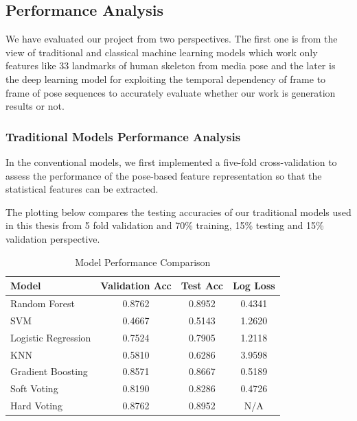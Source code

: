 \subsection{Performance Analysis}

We have evaluated our project from two perspectives. The first one is from the view of traditional and classical machine learning models which work only features like 33 landmarks of human skeleton from media pose and the later is the deep learning model for exploiting the temporal dependency of frame to frame of pose sequences to accurately evaluate whether our work is generation results or not.

\subsubsection{Traditional Models Performance Analysis}

In the conventional models, we first implemented a five-fold cross-validation to assess the performance of the pose-based feature representation so that the statistical features can be extracted.

The plotting below compares the testing accuracies of our traditional models used in this thesis from 5 fold validation and 70\% training, 15\% testing and 15\% validation perspective.

\begin{table}[htbp]
\centering
\caption{Model Performance Comparison}
\label{tab:model_comparison_after_split}
\begin{tabular}{l c c c}
\hline
\textbf{Model} & \textbf{Validation Acc} & \textbf{Test Acc} & \textbf{Log Loss} \\
\hline
Random Forest & 0.8762 & 0.8952 & 0.4341 \\
SVM & 0.4667 & 0.5143 & 1.2620 \\
Logistic Regression & 0.7524 & 0.7905 & 1.2118 \\
KNN & 0.5810 & 0.6286 & 3.9598 \\
Gradient Boosting & 0.8571 & 0.8667 & 0.5189 \\
Soft Voting & 0.8190 & 0.8286 & 0.4726 \\
Hard Voting & 0.8762 & 0.8952 & N/A \\
\hline
\end{tabular}
\end{table}

